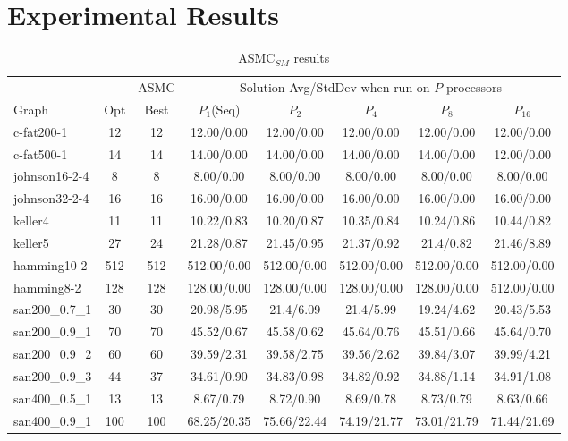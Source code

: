 \documentclass[11pt]{article}
\begin{document}
\section{Experimental Results}\label{results}

\linespread{1}
\begin{table*}[ht!]
\caption{ASMC$_{SM}$ results}\label{tab:spar_table}
\begin{footnotesize}
\begin{center}
\begin{tabular}{|l||c|c||c|c|c|c|c|}
\hline%
&&ASMC& \multicolumn{5}{|c|}{Solution Avg/StdDev when run on $P$ processors}\\
\cline{4-8}
Graph &Opt & Best      &$P_1$(Seq)  &$P_2$ &$P_4$   &$P_8$    &$P_{16}$\\
\hline											            				       
c-fat200-1 	&12 &12	   &12.00/0.00 &12.00/0.00 &12.00/0.00 &12.00/0.00 &12.00/0.00\\
c-fat500-1 	&14 &14	   &14.00/0.00 &14.00/0.00 &14.00/0.00 &14.00/0.00 &12.00/0.00\\
johnson16-2-4 	&8 	&8 	   &8.00/0.00 &8.00/0.00 &8.00/0.00 &8.00/0.00 &8.00/0.00\\
johnson32-2-4 	&16 &16    &16.00/0.00 &16.00/0.00 &16.00/0.00 &16.00/0.00 &16.00/0.00\\
\hline 
keller4 &11 &11 	&10.22/0.83 &10.20/0.87 &10.35/0.84 &10.24/0.86 &10.44/0.82\\
keller5 &27 &24     &21.28/0.87 &21.45/0.95 &21.37/0.92 &21.4/0.82 &21.46/8.89\\
hamming10-2 &512 &512 &512.00/0.00 &512.00/0.00 &512.00/0.00 &512.00/0.00 &512.00/0.00\\
hamming8-2 	&128 &128 &128.00/0.00 &128.00/0.00 &128.00/0.00 &128.00/0.00 &512.00/0.00\\
\hline
san200\_0.7\_1 	&30 &30 &20.98/5.95 &21.4/6.09 &21.4/5.99 &19.24/4.62 &20.43/5.53\\
san200\_0.9\_1 	&70 &70 &45.52/0.67 &45.58/0.62 &45.64/0.76 &45.51/0.66 &45.64/0.70\\
san200\_0.9\_2 	&60 &60 &39.59/2.31 &39.58/2.75 &39.56/2.62 &39.84/3.07 &39.99/4.21\\
san200\_0.9\_3 	&44 &37 &34.61/0.90 &34.83/0.98 &34.82/0.92 &34.88/1.14 &34.91/1.08\\
san400\_0.5\_1 	&13 &13 &8.67/0.79 &8.72/0.90 &8.69/0.78 &8.73/0.79 &8.63/0.66\\
san400\_0.9\_1 	&100 &100 &68.25/20.35 &75.66/22.44 &74.19/21.77 &73.01/21.79 &71.44/21.69\\

\end{tabular}
\end{center}
\end{footnotesize}
\end{table*}
\end{document}
